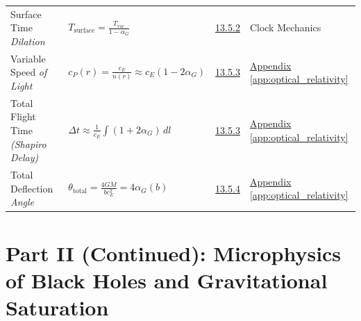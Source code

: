 \begin{longtable}{@{} p{4.5cm} p{6cm} c p{4cm} @{}}
Surface Time \newline \textit{Dilation} & $T_{\text{surface}} = \frac{T_{\text{vac}}}{1 - \alpha_G}$ & \hyperref[sec:13.5.2]{13.5.2} & Clock Mechanics \\

Variable Speed \newline \textit{of Light} & $c_P(r) = \frac{c_E}{n(r)} \approx c_E (1 - 2\alpha_G)$ & \hyperref[sec:13.5.3]{13.5.3} & \hyperref[app:optical_relativity]{Appendix \ref*{app:optical_relativity}} \\

Total Flight Time \newline \textit{(Shapiro Delay)} & $\Delta t \approx \frac{1}{c_E} \int (1 + 2\alpha_G) \, dl$ & \hyperref[sec:13.5.3]{13.5.3} & \hyperref[app:optical_relativity]{Appendix \ref*{app:optical_relativity}} \\

Total Deflection \newline \textit{Angle} & $\theta_{\text{total}} = \frac{4GM}{b c_E^2} = 4\alpha_G(b)$ & \hyperref[sec:13.5.4]{13.5.4} & \hyperref[app:optical_relativity]{Appendix \ref*{app:optical_relativity}} \\

\bottomrule
\end{longtable}

\newpage %

\section*{Part II (Continued): Microphysics of Black Holes and Gravitational Saturation}

